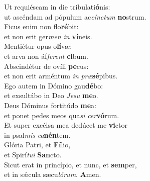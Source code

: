 \evenverse Ut requiéscam in die tribulati\textbf{ó}nis:~\*\\
\evenverse ut ascéndam ad pópulum ac\textit{cín}\textit{ctum} \textbf{no}strum.\\
\oddverse Ficus enim non flo\textbf{ré}bit:~\*\\
\oddverse et non erit ger\textit{men} \textit{in} \textbf{ví}neis.\\
\evenverse Mentiétur opus o\textbf{lí}væ:~\*\\
\evenverse et arva non áf\textit{fe}\textit{rent} \textbf{ci}bum.\\
\oddverse Abscindétur de ovíli \textbf{pe}cus:~\*\\
\oddverse et non erit arméntum \textit{in} \textit{præ}\textbf{sé}pibus.\\
\evenverse Ego autem in Dómino gau\textbf{dé}bo:~\*\\
\evenverse et exsultábo in Deo \textit{Je}\textit{su} \textbf{me}o.\\
\oddverse Deus Dóminus fortitúdo \textbf{me}a:~\*\\
\oddverse et ponet pedes meos qua\textit{si} \textit{cer}\textbf{vó}rum.\\
\evenverse Et super excélsa mea dedúcet me \textbf{vi}ctor~\*\\
\evenverse in psal\textit{mis} \textit{ca}\textbf{nén}tem.\\
\oddverse Glória Patri, et \textbf{Fí}lio,~\*\\
\oddverse et Spirí\textit{tu}\textit{i} \textbf{San}cto.\\
\evenverse Sicut erat in princípio, et nunc, et \textbf{sem}per,~\*\\
\evenverse et in sǽcula sæcu\textit{ló}\textit{rum}. \textbf{A}men.\\
